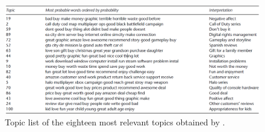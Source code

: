 \documentclass[a4paper]{article}
\begin{document}
			\begin{figure}
				\centering
				\caption{Topic list of the eighteen most relevant topics obtained by \citeauthor{article:muller}.}
				\label{fig:mullertopiclist}
				\includegraphics[width=1\linewidth]{Images/muller_topic_list}
			\end{figure}
		
\end{document}
